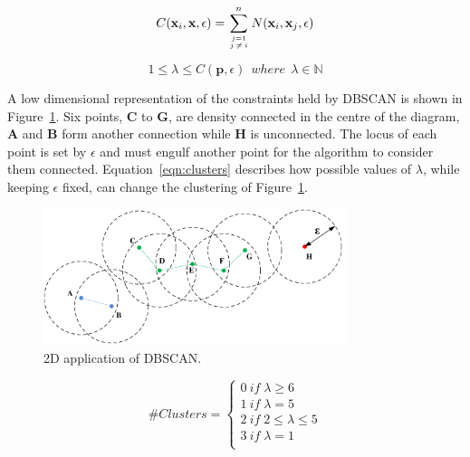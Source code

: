 \documentclass{ecsarticle}     %
\begin{document}
\begin{equation}
	C(\textbf{x}_i,\textbf{x},\epsilon) =  \sum\limits_{j=1 \atop j\:\neq\:i}^n N(\textbf{x}_i,\textbf{x}_j,\epsilon)	
	\label{eqn:member}
\end{equation}

\begin{equation}
	1 \leq \lambda \leq C(\textbf{p},\epsilon)\:\:where\:\:\lambda \in \mathbb{N}
	\label{eqn:inside}
\end{equation}

A low dimensional representation of the constraints held by DBSCAN is shown in Figure~\ref{fig:circles}.    %
Six points, \textbf{C} to \textbf{G}, are density connected in the centre of the diagram, \textbf{A} and \textbf{B} form another connection while \textbf{H} is unconnected.
The locus of each point is set by $\epsilon$ and must engulf another point for the algorithm to consider them connected.
Equation~\eqref{eqn:clusters} describes how possible values of $\lambda$, while keeping $\epsilon$ fixed, can change the clustering of Figure~\ref{fig:circles}.


\begin{figure}[ht]
   \centering
    \includegraphics[height = 4cm]{circles.pdf}
   \caption{2D application of DBSCAN.}
   \label{fig:circles}
\end{figure}

\begin{equation}
	\# Clusters = \left\{
		\begin{array}{l}
    		0\:if\; \lambda \geq 6\\
    		1\:if\; \lambda = 5 \\
			2\:if\; 2 \leq \lambda \leq 5 \\
			3\:if\; \lambda = 1\\
  		\end{array} \right.
	\label{eqn:clusters}
\end{equation}
\end{document}
